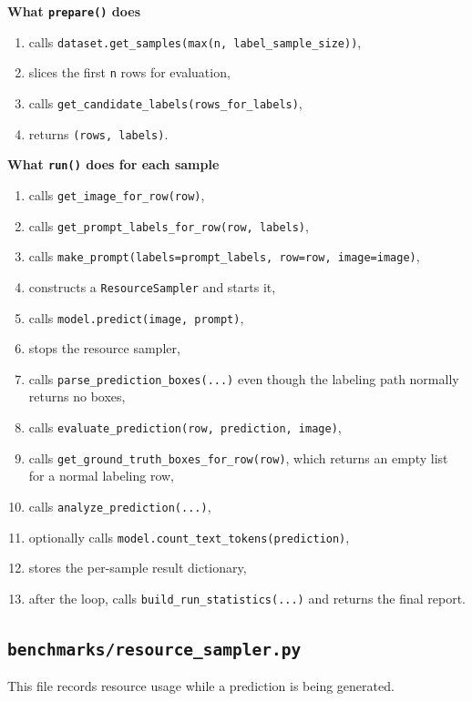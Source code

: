 \documentclass[11pt]{article}
\begin{document}
\textbf{What \texttt{prepare()} does}
\begin{enumerate}[label=\arabic*.]
    \item calls \texttt{dataset.get\_samples(max(n, label\_sample\_size))},
    \item slices the first \texttt{n} rows for evaluation,
    \item calls \texttt{get\_candidate\_labels(rows\_for\_labels)},
    \item returns \texttt{(rows, labels)}.
\end{enumerate}

\textbf{What \texttt{run()} does for each sample}
\begin{enumerate}[label=\arabic*.]
    \item calls \texttt{get\_image\_for\_row(row)},
    \item calls \texttt{get\_prompt\_labels\_for\_row(row, labels)},
    \item calls \texttt{make\_prompt(labels=prompt\_labels, row=row, image=image)},
    \item constructs a \texttt{ResourceSampler} and starts it,
    \item calls \texttt{model.predict(image, prompt)},
    \item stops the resource sampler,
    \item calls \texttt{parse\_prediction\_boxes(...)} even though the labeling path normally returns no boxes,
    \item calls \texttt{evaluate\_prediction(row, prediction, image)},
    \item calls \texttt{get\_ground\_truth\_boxes\_for\_row(row)}, which returns an empty list for a normal labeling row,
    \item calls \texttt{analyze\_prediction(...)},
    \item optionally calls \texttt{model.count\_text\_tokens(prediction)},
    \item stores the per-sample result dictionary,
    \item after the loop, calls \texttt{build\_run\_statistics(...)} and returns the final report.
\end{enumerate}

\subsection*{\texttt{benchmarks/resource\_sampler.py}}
This file records resource usage while a prediction is being generated.
\end{document}
